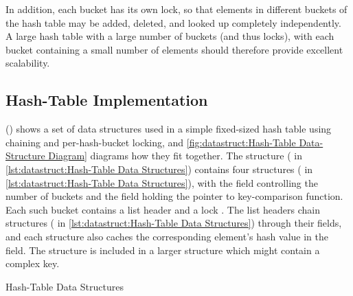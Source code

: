 \QuickQuizEnd

In addition, each bucket has its own lock, so that elements in different
buckets of the hash table may be added, deleted, and looked up completely
independently.
A large hash table with a large number of buckets (and thus locks), with
each bucket containing a small number of elements should therefore provide
excellent scalability.

\subsection{Hash-Table Implementation}
\label{sec:datastruct:Hash-Table Implementation}

\begin{fcvref}
()
shows a set of data structures used in a simple fixed-sized hash
table using chaining and per-hash-bucket locking, and
\cref{fig:datastruct:Hash-Table Data-Structure Diagram}
diagrams how they fit together.
The  structure ( in
\cref{lst:datastruct:Hash-Table Data Structures})
contains four  structures
( in
\cref{lst:datastruct:Hash-Table Data Structures}),
with the  field controlling the number of buckets
and the  field holding the pointer to key-comparison
function.
Each such bucket contains a list header  and
a lock .
The list headers chain  structures
( in
\cref{lst:datastruct:Hash-Table Data Structures})
through their
 fields, and each  structure also caches
the corresponding element's hash value in the  field.
The  structure is included in a larger structure
which might contain a complex key.
\end{fcvref}

\begin{listing}

\caption{Hash-Table Data Structures}
\label{lst:datastruct:Hash-Table Data Structures}
\end{listing}


